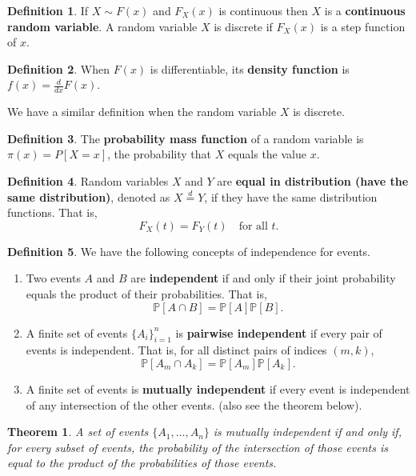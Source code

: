 \documentclass[11pt,a4paper]{amsart}
\theoremstyle{plain}
\newtheorem{theorem}{Theorem}
\theoremstyle{definition}
\newtheorem{definition}{Definition}
\begin{document}
		\begin{definition}
		If $X \sim F(x)$ and $F_{X}(x)$ is continuous then $X$ is a \textbf{continuous random variable}. A random variable $X$ is discrete if $F_{X}(x)$ is a step function of $x$.
	\end{definition}
	
	\begin{definition}
			When $F(x)$ is differentiable, its \textbf{density function} is $f(x) = \frac{d}{dx} F(x)$.
	\end{definition}

	We have a similar definition when the random variable $X$ is discrete.
	
	\begin{definition}
	The \textbf{probability mass function} of a random variable is $ \pi(x) = P[X = x]$, the probability that $X$ equals the value $x$. 
	\end{definition}
	
	\begin{definition}\label{same distribution}
		Random variables $X$ and $Y$ are \textbf{equal in distribution (have the same distribution)}, denoted as $X \stackrel{d}{=} Y$, if they have the same distribution functions. That is, 
		\[	F_{X}(t) = F_{Y}(t) \quad \text{for all }t.	\]
	\end{definition}
	
	\begin{definition}\label{independence}
		We have the following concepts of independence for events.
		\begin{enumerate}
			\item Two events $A$ and $B$ are \textbf{independent} if and only if their joint probability equals the product of their probabilities. That is, 
		 \[	\mathbb{P}[A \cap B]  = \mathbb{P}[A]\mathbb{P}[B].	\]
		 	\item A finite set of events $\{A_{i}\}^{n}_{i=1}$ is \textbf{pairwise independent} if every pair of events is independent. That is, for all distinct pairs of indices $(m,k)$, 
		 	\[	\mathbb{P}[A_{m} \cap A_{k}]  = \mathbb{P}[A_{m}]\mathbb{P}[A_{k}].	\]
		 	\item A finite set of events is \textbf{mutually independent} if every event is independent of any intersection of the other events. (also see the theorem below).
		\end{enumerate}
	\end{definition}
	\begin{theorem}
		A set of events $\{A_{1}, \dots, A_{n}\}$ is mutually independent if and only if, for every subset of events, the probability of the intersection of those events is equal to the product of the probabilities of those events.
	\end{theorem}
	
\end{document}
